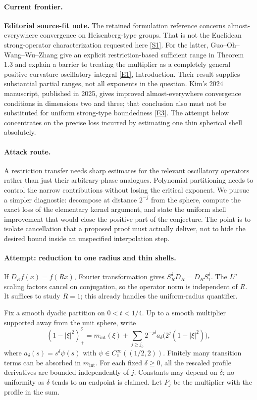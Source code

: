 \documentclass[11pt,a4paper]{article}
\newcommand{\sref}[2]{\hyperlink{source:#1:#2}{[S#2]}}
\newcommand{\eref}[2]{\hyperlink{extra:#1:#2}{[E#2]}}
\numberwithin{equation}{section}
\begin{document}
\paragraph{Current frontier.}
\textbf{Editorial source-fit note.} The retained formulation reference
concerns almost-everywhere convergence on Heisenberg-type groups. That is
not the Euclidean strong-operator characterization requested here
\sref{statement}{1}. For the latter, Guo--Oh--Wang--Wu--Zhang give an explicit
restriction-based sufficient range in Theorem 1.3 and explain a barrier to
treating the multiplier as a completely general positive-curvature
oscillatory integral \eref{statement}{1}, Introduction. Their result supplies
substantial partial ranges, not all exponents in the question. Kim's
2024 manuscript, published in 2025, gives improved almost-everywhere
convergence conditions in dimensions two and three; that conclusion also
must not be substituted for uniform strong-type boundedness
\eref{statement}{3}. The attempt below concentrates on the precise loss incurred
by estimating one thin spherical shell absolutely.

\paragraph{Attack route.}
A restriction transfer needs sharp estimates for the relevant oscillatory
operators rather than just their arbitrary-phase analogues. Polynomial
partitioning needs to control the narrow contributions without losing the
critical exponent. We pursue a simpler diagnostic: decompose at distance
$2^{-j}$ from the sphere, compute the exact loss of the elementary
kernel argument, and state the uniform shell improvement that would close
the positive part of the conjecture. The point is to isolate cancellation
that a proposed proof must actually deliver, not to hide the desired bound
inside an unspecified interpolation step.

\paragraph{Attempt: reduction to one radius and thin shells.}
If $D_Rf(x)=f(Rx)$, Fourier transformation gives
$S_R^\delta D_R=D_RS_1^\delta$. The $L^p$ scaling factors cancel on
conjugation, so the operator norm is independent of $R$. It suffices to
study $R=1$; this already handles the uniform-radius quantifier.

Fix a smooth dyadic partition on $0<t<1/4$. Up to a smooth multiplier
supported away from the unit sphere, write
\begin{equation}\label{eq180-shells}
 (1-|\xi|^2)_+^\delta
 =m_{\mathrm{int}}(\xi)+\sum_{j\ge j_0}2^{-j\delta}
          a_\delta\bigl(2^j(1-|\xi|^2)\bigr),
\end{equation}
where $a_\delta(s)=s^\delta\psi(s)$ with
$\psi\in C_c^\infty((1/2,2))$. Finitely many transition terms can be
absorbed in $m_{\mathrm{int}}$. For each fixed $\delta\ge0$, all the
rescaled profile derivatives are bounded independently of $j$. Constants
may depend on $\delta$; no uniformity as $\delta$ tends to an endpoint is
claimed. Let $P_j$ be the multiplier with the profile in the sum.
\end{document}
